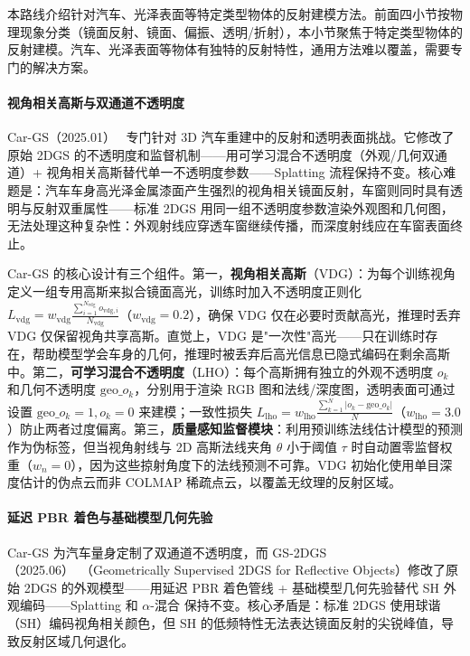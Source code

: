 本路线介绍针对汽车、光泽表面等特定类型物体的反射建模方法。前面四小节按物理现象分类（镜面反射、镜面、偏振、透明/折射），本小节聚焦于特定类型物体的反射建模。汽车、光泽表面等物体有独特的反射特性，通用方法难以覆盖，需要专门的解决方案。

\paragraph{视角相关高斯与双通道不透明度}

Car-GS（2025.01）~\cite{2501_11020} 专门针对 3D 汽车重建中的反射和透明表面挑战。它修改了原始 2DGS 的不透明度和监督机制——用可学习混合不透明度（外观/几何双通道）+ 视角相关高斯替代单一不透明度参数——Splatting 流程保持不变。核心难题是：汽车车身高光泽金属漆面产生强烈的视角相关镜面反射，车窗则同时具有透明与反射双重属性——标准 2DGS 用同一组不透明度参数渲染外观图和几何图，无法处理这种复杂性：外观射线应穿透车窗继续传播，而深度射线应在车窗表面终止。

Car-GS 的核心设计有三个组件。第一，\textbf{视角相关高斯}（VDG）：为每个训练视角定义一组专用高斯来拟合镜面高光，训练时加入不透明度正则化 $L_{\text{vdg}} = w_{\text{vdg}}\frac{\sum_{i=1}^{N_{\text{vdg}}} o_{\text{vdg},i}}{N_{\text{vdg}}}$（$w_{\text{vdg}}{=}0.2$），确保 VDG 仅在必要时贡献高光，推理时丢弃 VDG 仅保留视角共享高斯。直觉上，VDG 是"一次性"高光——只在训练时存在，帮助模型学会车身的几何，推理时被丢弃后高光信息已隐式编码在剩余高斯中。第二，\textbf{可学习混合不透明度}（LHO）：每个高斯拥有独立的外观不透明度 $o_k$ 和几何不透明度 $\text{geo}\_o_k$，分别用于渲染 RGB 图和法线/深度图，透明表面可通过设置 $\text{geo}\_o_k{=}1, o_k{=}0$ 来建模；一致性损失 $L_{\text{lho}} = w_{\text{lho}}\frac{\sum_{k=1}^{N}|o_k - \text{geo}\_o_k|}{N}$（$w_{\text{lho}}{=}3.0$）防止两者过度偏离。第三，\textbf{质量感知监督模块}：利用预训练法线估计模型的预测作为伪标签，但当视角射线与 2D 高斯法线夹角 $\theta$ 小于阈值 $\tau$ 时自动置零监督权重（$w_n{=}0$），因为这些掠射角度下的法线预测不可靠。VDG 初始化使用单目深度估计的伪点云而非 COLMAP 稀疏点云，以覆盖无纹理的反射区域。

\paragraph{延迟 PBR 着色与基础模型几何先验}

Car-GS 为汽车量身定制了双通道不透明度，而 GS-2DGS（2025.06）~\cite{2506_13110}（Geometrically Supervised 2DGS for Reflective Objects）修改了原始 2DGS 的外观模型——用延迟 PBR 着色管线 + 基础模型几何先验替代 SH 外观编码——Splatting 和 $\alpha$-混合 保持不变。核心矛盾是：标准 2DGS 使用球谐（SH）编码视角相关颜色，但 SH 的低频特性无法表达镜面反射的尖锐峰值，导致反射区域几何退化。

